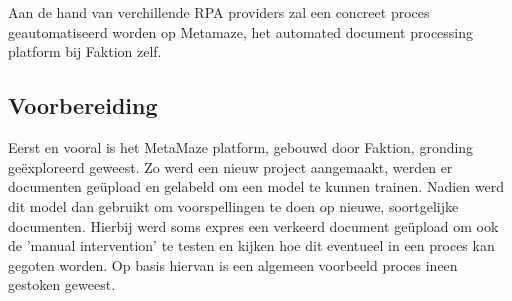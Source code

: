 
\chapter{}
\label{ch:methodologie}


Aan de hand van verchillende RPA providers zal een concreet proces geautomatiseerd worden op Metamaze, het automated document processing platform bij Faktion zelf.


\section{Voorbereiding}


Eerst en vooral is het MetaMaze platform, gebouwd door Faktion, gronding geëxploreerd geweest. Zo werd een nieuw project aangemaakt, werden er documenten geüpload en gelabeld om een model te kunnen trainen. Nadien werd dit model dan gebruikt om voorspellingen te doen op nieuwe, soortgelijke documenten. Hierbij werd soms expres een verkeerd document geüpload om ook de 'manual intervention' te testen en kijken hoe dit eventueel in een proces kan gegoten worden. Op basis hiervan is een algemeen voorbeeld proces ineen gestoken geweest.

